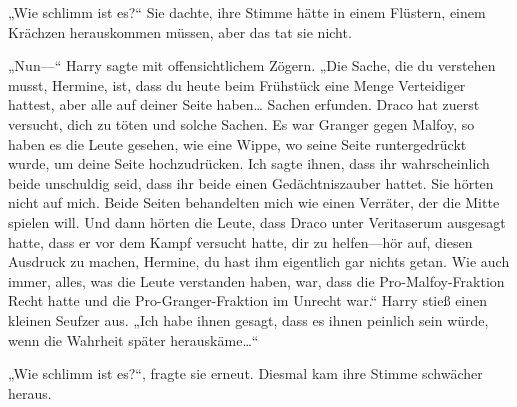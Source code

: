 „Wie schlimm ist es?“ Sie dachte, ihre Stimme hätte in einem Flüstern, einem Krächzen herauskommen müssen, aber das tat sie nicht.

„Nun—“ Harry sagte mit offensichtlichem Zögern. „Die Sache, die du verstehen musst, Hermine, ist, dass du heute beim Frühstück eine Menge Verteidiger hattest, aber alle auf deiner Seite haben… Sachen erfunden. Draco hat zuerst versucht, dich zu töten und solche Sachen. Es war Granger gegen Malfoy, so haben es die Leute gesehen, wie eine Wippe, wo seine Seite runtergedrückt wurde, um deine Seite hochzudrücken. Ich sagte ihnen, dass ihr wahrscheinlich beide unschuldig seid, dass ihr beide einen Gedächtniszauber hattet. Sie hörten nicht auf mich. Beide Seiten behandelten mich wie einen Verräter, der die Mitte spielen will. Und dann hörten die Leute, dass Draco unter Veritaserum ausgesagt hatte, dass er vor dem Kampf versucht hatte, dir zu helfen—hör auf, diesen Ausdruck zu machen, Hermine, du hast ihm eigentlich gar nichts getan. Wie auch immer, alles, was die Leute verstanden haben, war, dass die Pro-Malfoy-Fraktion Recht hatte und die Pro-Granger-Fraktion im Unrecht war.“ Harry stieß einen kleinen Seufzer aus. „Ich habe ihnen gesagt, dass es ihnen peinlich sein würde, wenn die Wahrheit später herauskäme…“

„Wie schlimm ist es?“, fragte sie erneut. Diesmal kam ihre Stimme schwächer heraus.

